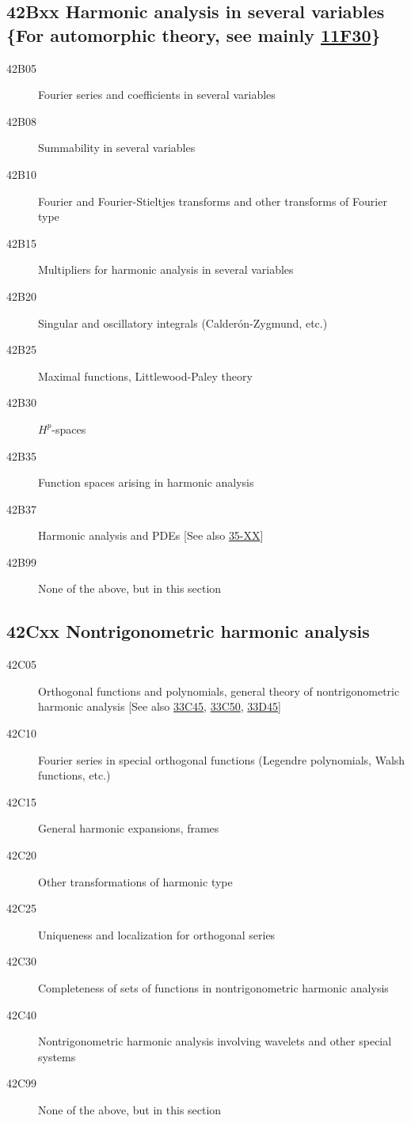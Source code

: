 \documentclass[letterpaper]{article}
\begin{document}
\subsection*{42Bxx  Harmonic analysis in several variables \{For automorphic theory, see mainly \hyperref[11F30]{11F30}\} }\label{42Bxx}
\begin{description}  
\item [42B05]\label{42B05} Fourier series and coefficients in several variables
\item [42B08]\label{42B08} Summability in several variables
\item [42B10]\label{42B10} Fourier and Fourier-Stieltjes transforms and other transforms of Fourier type
\item [42B15]\label{42B15} Multipliers for harmonic analysis in several variables
\item [42B20]\label{42B20} Singular and oscillatory integrals (Calder\'{o}n-Zygmund, etc.)
\item [42B25]\label{42B25} Maximal functions, Littlewood-Paley theory
\item [42B30]\label{42B30} $H^p$-spaces
\item [42B35]\label{42B35} Function spaces arising in harmonic analysis
\item [42B37]\label{42B37} Harmonic analysis and PDEs [See also \hyperref[35-XX]{35-XX}]
\item [42B99]\label{42B99} None of the above, but in this section
\end{description}
\subsection*{42Cxx  Nontrigonometric harmonic analysis }\label{42Cxx}
\begin{description} 
\item [42C05]\label{42C05} Orthogonal functions and polynomials, general theory of nontrigonometric harmonic analysis [See also \hyperref[33C45]{33C45}, \hyperref[33C50]{33C50}, \hyperref[33D45]{33D45}]
\item [42C10]\label{42C10} Fourier series in special orthogonal functions (Legendre polynomials, Walsh functions, etc.)
\item [42C15]\label{42C15} General harmonic expansions, frames
\item [42C20]\label{42C20} Other transformations of harmonic type
\item [42C25]\label{42C25} Uniqueness and localization for orthogonal series
\item [42C30]\label{42C30} Completeness of sets of functions in nontrigonometric harmonic analysis
\item [42C40]\label{42C40} Nontrigonometric harmonic analysis involving wavelets and other special systems
\item [42C99]\label{42C99} None of the above, but in this section
\end{description}
\end{document}
